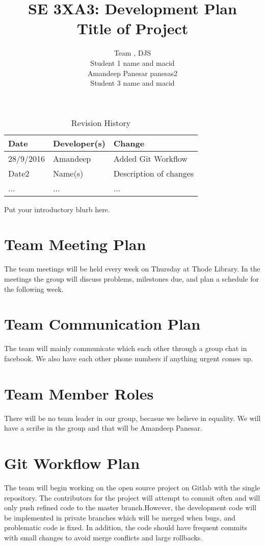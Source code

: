 \documentclass{article}
\title{SE 3XA3: Development Plan\\Title of Project}
\author{Team \12, DJS
		\\ Student 1 name and macid
		\\ Amandeep Panesar panesas2
		\\ Student 3 name and macid
}
\date{}
\begin{document}
\begin{table}[hp]
\caption{Revision History} \label{TblRevisionHistory}
\begin{tabularx}{\textwidth}{llX}
\toprule
\textbf{Date} & \textbf{Developer(s)} & \textbf{Change}\\
\midrule
28/9/2016 & Amandeep & Added Git Workflow\\
Date2 & Name(s) & Description of changes\\
... & ... & ...\\
\bottomrule
\end{tabularx}
\end{table}

\newpage

\maketitle

Put your introductory blurb here.

\section{Team Meeting Plan}
The team meetings will be held every week on Thursday at Thode Library. In the meetings the group will discuss problems, milestones due, and plan a schedule for the following week. 
\section{Team Communication Plan}
The team will mainly communicate which each other through a group chat in facebook. We also have each other phone numbers if anything urgent comes up.  
\section{Team Member Roles}
There will be no team leader in our group, becasue we believe in equality. We will have a scribe in the group and that will be Amandeep Panesar.  
\section{Git Workflow Plan}
The team will begin working on the open source project on Gitlab with the single repository. The contributors for the project will attempt to commit often and will only push refined code to the master branch.However, the development code will be implemented in private branches which will be merged when bugs, and problematic code is fixed. In addition, the code should have frequent commits with small changes to avoid merge conflicts and large rollbacks. 
\end{document}
